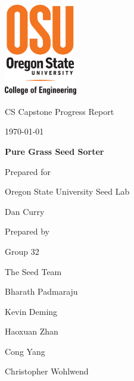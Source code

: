\documentclass[onecolumn, draftclsnofoot,10pt, compsoc]{IEEEtran}
\def \CapstoneTeamName{		The Seed Team}
\def \CapstoneTeamNumber{		32}
\def \GroupMemberOne{			Bharath Padmaraju}
\def \GroupMemberTwo{			Kevin Deming}
\def \GroupMemberThree{			Haoxuan Zhan}
\def \GroupMemberFour{			Cong Yang}
\def \GroupMemberFive{			Christopher Wohlwend}
\def \CapstoneProjectName{		Pure Grass Seed Sorter}
\def \CapstoneSponsorCompany{	Oregon State University Seed Lab}
\def \CapstoneSponsorPerson{		Dan Curry}
\def \DocType{		%
				Progress Report
				}
\newcommand{\NameSigPair}[1]{\par
\makebox[2.75in][r]{#1} \hfil 	\makebox[3.25in]{\makebox[2.25in]{\hrulefill} \hfill		\makebox[.75in]{\hrulefill}}
\par\vspace{-12pt} \textit{\tiny\noindent
\makebox[2.75in]{} \hfil		\makebox[3.25in]{\makebox[2.25in][r]{Signature} \hfill	\makebox[.75in][r]{Date}}}}
\renewcommand{\NameSigPair}[1]{#1}
\begin{document}
\begin{titlepage}
    \begin{singlespace}
    	\includegraphics[height=4cm]{coe_v_spot1}
        \hfill 
        \par\vspace{.2in}
        \centering
        \scshape{
            \huge CS Capstone \DocType \par
            {\large\today}\par
            \vspace{.5in}
            \textbf{\Huge\CapstoneProjectName}\par
            \vfill
            {\large Prepared for}\par
            \Huge \CapstoneSponsorCompany\par
            \vspace{5pt}
            {\Large\NameSigPair{\CapstoneSponsorPerson}\par}
            {\large Prepared by }\par
            Group\CapstoneTeamNumber\par
            \CapstoneTeamName\par 
            \vspace{5pt}
            {\Large
                \NameSigPair{\GroupMemberOne}\par
                \NameSigPair{\GroupMemberTwo}\par
                \NameSigPair{\GroupMemberThree}\par
                \NameSigPair{\GroupMemberFour}\par
                \NameSigPair{\GroupMemberFive}\par
            }
            \vspace{20pt}
        }
        \begin{abstract}

\end{abstract}
\end{singlespace}
\end{titlepage}
\end{document}
